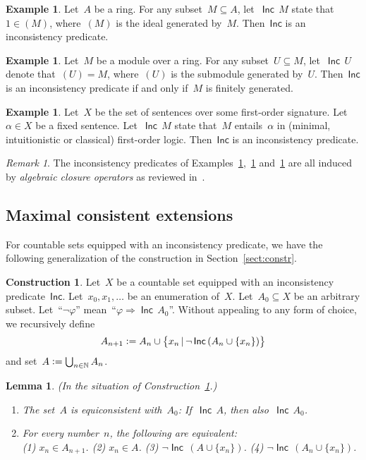 \documentclass[com,11pt,crcready]{iosart2x}
\theoremstyle{definition}
\newtheorem{construction}[definition]{Construction}
\newtheorem{example}[definition]{Example}
\theoremstyle{plain}
\newtheorem{lemma}[definition]{Lemma}
\theoremstyle{remark}
\newtheorem{remark}[definition]{Remark}
\newcommand{\Incbare}{\mathsf{Inc}}
\newcommand{\Inc}[1]{\operatorname{\Incbare}\,#1}
\newcommand{\?}{\,{:}\,}
\newcommand{\NN}{\mathbb{N}}
\newcommand{\defeq}{\vcentcolon=}
\renewcommand{\_}{\mathpunct{.}\,}
\begin{document}
\begin{example}\label{ex:inc-ring}Let~$A$ be a ring. For any subset~$M \subseteq A$, let~$\Inc{M}$
state that~$1 \in (M)$, where~$(M)$ is the ideal generated by~$M$. Then~$\Incbare$ is an
inconsistency predicate.\end{example}

\begin{example}\label{ex:inc-module}Let~$M$ be a module over a ring. For any subset~$U \subseteq M$,
let~$\Inc{U}$ denote that~$(U) = M$, where~$(U)$ is the submodule generated
by~$U$. Then~$\Incbare$ is an inconsistency predicate if and
only if~$M$ is finitely generated.\end{example}

\begin{example}\label{ex:inc-formulas}Let~$X$ be the set of sentences over some first-order
signature. Let~$\alpha \in X$ be a fixed sentence. Let~$\Inc{M}$ state that~$M$
entails~$\alpha$ in (minimal, intuitionistic or classical) first-order logic. Then~$\Incbare$ is an inconsistency
predicate.\end{example}

\begin{remark}The inconsistency predicates of
Examples~\ref{ex:inc-ring},~\ref{ex:inc-module} and~\ref{ex:inc-formulas} are
all induced by \emph{algebraic closure operators} as reviewed
in~\cite[Example~1]{wessel-schuster:radical}.\end{remark}


\subsection{Maximal consistent extensions}

For countable sets equipped with an inconsistency predicate, we have the
following generalization of the construction in Section~\ref{sect:constr}.

\begin{construction}\label{constr:inc}Let~$X$ be a countable set equipped with
an inconsistency predicate~$\Incbare$. Let~$x_0,x_1,\ldots$ be an enumeration of~$X$.
Let~$A_0 \subseteq X$ be an arbitrary subset. Let~``$\neg\varphi$''
mean~``$\varphi \Rightarrow \Inc{A_0}$''. Without appealing to any form of choice,
we recursively define
\[ A_{n+1} \defeq A_n \cup \bigl\{ x_n \,|\, \neg \Inc{(A_n\cup\{x_n\})} \bigr\} \]
and set~$A \defeq \bigcup_{n \in \NN} A_n$.
\end{construction}

\begin{lemma}\label{lemma:omnibus-inc}(In the situation of
Construction~\ref{constr:inc}.)
\begin{enumerate}
\item[(a)] The set~$A$ is equiconsistent with~$A_0$: If~$\Inc{A}$, then also~$\Inc{A_0}$.
\item[(b)] For every number~$n$, the following are equivalent: \\
(1) $x_n \in A_{n+1}$. \quad
(2) $x_n \in A$. \quad
(3) $\neg \Inc{(A\cup\{x_n\})}$. \quad
(4) $\neg \Inc{(A_n \cup \{x_n\})}$.
\end{enumerate}\end{lemma}
\end{document}
